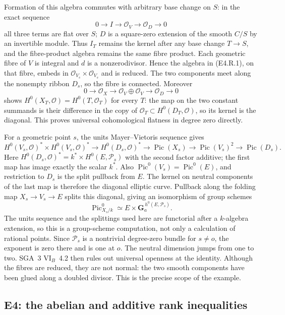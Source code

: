Formation of this algebra commutes with arbitrary base change on $S$:
in the exact sequence
\[
 0\longrightarrow I\longrightarrow\mathcal O_V
     \longrightarrow\mathcal O_D\longrightarrow0
\]
all three terms are flat over $S$; $D$ is a square-zero extension of the
smooth $C/S$ by an invertible module. Thus $I_T$ remains the kernel after
any base change $T\to S$, and the fibre-product algebra remains the same
fibre product. Each geometric fibre of $V$ is integral and $d$ is a
nonzerodivisor. Hence the algebra in (E4.R.1), on that fibre, embeds in
$\mathcal O_{V_s}\times\mathcal O_{V_s}$ and is reduced. The two components
meet along the nonempty ribbon $D_s$, so the fibre is connected. Moreover
\[
 0\longrightarrow\mathcal O_X\longrightarrow
 \mathcal O_V\oplus\mathcal O_V\longrightarrow\mathcal O_D\longrightarrow0
\]
shows $H^0(X_T,\mathcal O)=H^0(T,\mathcal O_T)$ for every $T$: the map on
the two constant summands is their difference in the copy of
$\mathcal O_T\subset H^0(D_T,\mathcal O)$, so its kernel is the diagonal.
This proves universal cohomological flatness in degree zero directly.

For a geometric point $s$, the units Mayer--Vietoris sequence gives
\[
 H^0(V_s,\mathcal O)^*\times H^0(V_s,\mathcal O)^*
 \longrightarrow H^0(D_s,\mathcal O)^*
 \longrightarrow\operatorname{Pic}(X_s)
 \longrightarrow\operatorname{Pic}(V_s)^2
 \longrightarrow\operatorname{Pic}(D_s).
\]
Here $H^0(D_s,\mathcal O)^*=k^*\times H^0(E,\mathcal P_s)$ with the
second factor additive; the first map has image exactly the scalar $k^*$.
Also $\operatorname{Pic}^0(V_s)=\operatorname{Pic}^0(E)$, and restriction to
$D_s$ is the split pullback from $E$. The kernel on neutral components of
the last map is therefore the diagonal elliptic curve. Pullback along the
folding map $X_s\to V_s\to E$ splits this diagonal, giving an isomorphism
of group schemes
\[
 \operatorname{Pic}^0_{X_s/k}
  \simeq E\times\mathbf G_a^{\,h^0(E,\mathcal P_s)}.
\]
The units sequence and the splittings used here are functorial after a
$k$-algebra extension, so this is a group-scheme computation, not only a
calculation of rational points. Since $\mathcal P_s$ is a nontrivial
degree-zero bundle for $s\ne o$, the exponent is zero there and is one
at $o$. The neutral dimension jumps from one to two. SGA~3 VI$_B$~4.2
then rules out universal openness at the identity. Although the fibres
are reduced, they are not normal: the two smooth components have been
glued along a doubled divisor. This is the precise scope of the example.

\subsection{E4: the abelian and additive rank inequalities}

